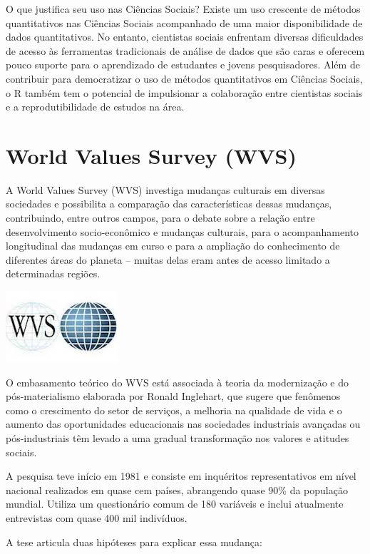 \documentclass[
  10pt,
  brazil,
  a4paper,
  twoside, notitlepage, openright]{book}
\begin{document}
O que justifica seu uso nas Ciências Sociais? Existe um uso crescente de métodos quantitativos nas Ciências Sociais acompanhado de uma maior disponibilidade de dados quantitativos. No entanto, cientistas sociais enfrentam diversas dificuldades de acesso às ferramentas tradicionais de análise de dados que são caras e oferecem pouco suporte para o aprendizado de estudantes e jovens pesquisadores. Além de contribuir para democratizar o uso de métodos quantitativos em Ciências Sociais, o R também tem o potencial de impulsionar a colaboração entre cientistas sociais e a reprodutibilidade de estudos na área.

\hypertarget{world-values-survey-wvs}{%
\section{World Values Survey (WVS)}\label{world-values-survey-wvs}}

A World Values Survey (WVS) investiga mudanças culturais em diversas sociedades e possibilita a comparação das características dessas mudanças, contribuindo, entre outros campos, para o debate sobre a relação entre desenvolvimento socio-econômico e mudanças culturais, para o acompanhamento longitudinal das mudanças em curso e para a ampliação do conhecimento de diferentes áreas do planeta -- muitas delas eram antes de acesso limitado a determinadas regiões.

\includegraphics{img/wvs_asso.jpg}

O embasamento teórico do WVS está associada à teoria da modernização e do pós-materialismo elaborada por Ronald Inglehart, que sugere que fenômenos como o crescimento do setor de serviços, a melhoria na qualidade de vida e o aumento das oportunidades educacionais nas sociedades industriais avançadas ou pós-industriais têm levado a uma gradual transformação nos valores e atitudes sociais.

A pesquisa teve início em 1981 e consiste em inquéritos representativos em nível nacional realizados em quase cem países, abrangendo quase 90\% da população mundial. Utiliza um questionário comum de 180 variáveis e inclui atualmente entrevistas com quase 400 mil indivíduos.

A tese articula duas hipóteses para explicar essa mudança:
\end{document}
